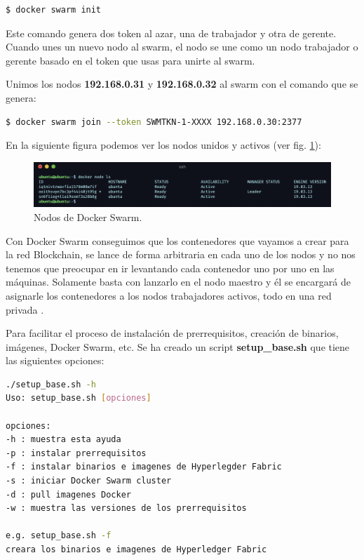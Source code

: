 \begin{lstlisting}[language=bash]
  $ docker swarm init
\end{lstlisting}

\noindent Este comando genera dos token al azar, una de trabajador y otra de gerente. Cuando unes un nuevo nodo al 
swarm, el nodo se une como un nodo trabajador o gerente basado en el token que usas para unirte al swarm.

\vspace{5mm}

\noindent Unimos los nodos \textbf{192.168.0.31} y \textbf{192.168.0.32} al swarm con el comando que se genera: 

\begin{lstlisting}[language=bash]
  $ docker swarm join --token SWMTKN-1-XXXX 192.168.0.30:2377
\end{lstlisting}

\newpage

\noindent En la siguiente figura podemos ver los nodos unidos y activos (ver fig. \ref{fig:node-ls-worker}):

\begin{figure}[ht!]
  \centering
  \includegraphics[width=\textwidth]{imagenes/desarrollo/comandos/node_ls_worker}
  \caption{Nodos de Docker Swarm.}
  \label{fig:node-ls-worker}
\end{figure}

\noindent Con Docker Swarm conseguimos que los contenedores que vayamos a crear para la red Blockchain, se lance de forma 
arbitraria en cada uno de los nodos y no nos tenemos que preocupar en ir levantando cada contenedor uno por uno
en las máquinas. Solamente basta con lanzarlo en el nodo maestro y él se encargará de asignarle los contenedores
a los nodos trabajadores activos, todo en una red privada \cite{hyperledger-fabric-rasp-swarm}.

\vspace{5mm}

\noindent Para facilitar el proceso de instalación de prerrequisitos, creación de binarios, imágenes, Docker Swarm, etc. 
Se ha creado un script \textbf{setup\_base.sh} que tiene las siguientes opciones:

\begin{lstlisting}[language=bash]
./setup_base.sh -h
Uso: setup_base.sh [opciones]

opciones:
-h : muestra esta ayuda
-p : instalar prerrequisitos
-f : instalar binarios e imagenes de Hyperlegder Fabric
-s : iniciar Docker Swarm cluster
-d : pull imagenes Docker
-w : muestra las versiones de los prerrequisitos

e.g. setup_base.sh -f
creara los binarios e imagenes de Hyperledger Fabric
\end{lstlisting}

